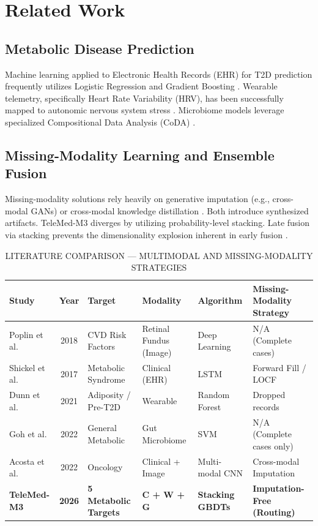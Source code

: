 \documentclass[journal, twocolumn]{IEEEtran}
\begin{document}
\section{Related Work}
\subsection{Metabolic Disease Prediction}
Machine learning applied to Electronic Health Records (EHR) for T2D prediction frequently utilizes Logistic Regression and Gradient Boosting \cite{poplin2018cvd}. Wearable telemetry, specifically Heart Rate Variability (HRV), has been successfully mapped to autonomic nervous system stress \cite{dunn2021wearables}. Microbiome models leverage specialized Compositional Data Analysis (CoDA) \cite{goh2022microbiome}.

\subsection{Missing-Modality Learning and Ensemble Fusion}
Missing-modality solutions rely heavily on generative imputation (e.g., cross-modal GANs) or cross-modal knowledge distillation \cite{acosta2022multimodal}. Both introduce synthesized artifacts. TeleMed-M3 diverges by utilizing probability-level stacking. Late fusion via stacking prevents the dimensionality explosion inherent in early fusion \cite{wolpert1992stacked}.

\begin{table}[htbp]
\centering
\caption{LITERATURE COMPARISON — MULTIMODAL AND MISSING-MODALITY STRATEGIES}
\begin{tabular}{|l|c|l|l|l|l|}
\hline
\textbf{Study} & \textbf{Year} & \textbf{Target} & \textbf{Modality} & \textbf{Algorithm} & \textbf{Missing-Modality Strategy} \\
\hline
Poplin et al. \cite{poplin2018cvd} & 2018 & CVD Risk Factors & Retinal Fundus (Image) & Deep Learning & N/A (Complete cases) \\
Shickel et al. \cite{shickel2017ehr} & 2017 & Metabolic Syndrome & Clinical (EHR) & LSTM & Forward Fill / LOCF \\
Dunn et al. \cite{dunn2021wearables} & 2021 & Adiposity / Pre-T2D & Wearable & Random Forest & Dropped records \\
Goh et al. \cite{goh2022microbiome} & 2022 & General Metabolic & Gut Microbiome & SVM & N/A (Complete cases only) \\
Acosta et al. \cite{acosta2022multimodal} & 2022 & Oncology & Clinical + Image & Multi-modal CNN & Cross-modal Imputation \\
\textbf{TeleMed-M3} & \textbf{2026} & \textbf{5 Metabolic Targets} & \textbf{C + W + G} & \textbf{Stacking GBDTs} & \textbf{Imputation-Free (Routing)} \\
\hline
\end{tabular}
\end{table}
\end{document}
